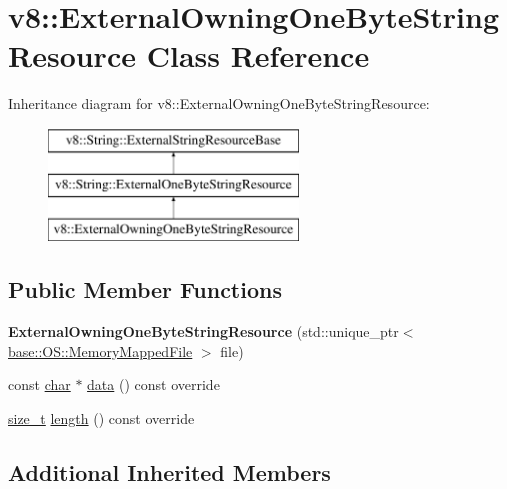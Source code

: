 \hypertarget{classv8_1_1ExternalOwningOneByteStringResource}{}\section{v8\+:\+:External\+Owning\+One\+Byte\+String\+Resource Class Reference}
\label{classv8_1_1ExternalOwningOneByteStringResource}
Inheritance diagram for v8\+:\+:External\+Owning\+One\+Byte\+String\+Resource\+:\begin{figure}[H]
\begin{center}
\leavevmode
\includegraphics[height=3.000000cm]{classv8_1_1ExternalOwningOneByteStringResource}
\end{center}
\end{figure}
\subsection*{Public Member Functions}
\begin{DoxyCompactItemize}
\item 
\mbox{\label{classv8_1_1ExternalOwningOneByteStringResource_a68d1c348d735d92c3309b67fcca83bb2}} 
{\bfseries External\+Owning\+One\+Byte\+String\+Resource} (std\+::unique\+\_\+ptr$<$ \mbox{\hyperlink{classv8_1_1base_1_1OS_1_1MemoryMappedFile}{base\+::\+O\+S\+::\+Memory\+Mapped\+File}} $>$ file)
\item 
const \mbox{\hyperlink{classchar}{char}} $\ast$ \mbox{\hyperlink{classv8_1_1ExternalOwningOneByteStringResource_a212c07a5f7faba9bd71544bdb6dbd321}{data}} () const override
\item 
\mbox{\hyperlink{classsize__t}{size\+\_\+t}} \mbox{\hyperlink{classv8_1_1ExternalOwningOneByteStringResource_a162cec5c2469a2acf26efe384ceffe32}{length}} () const override
\end{DoxyCompactItemize}
\subsection*{Additional Inherited Members}


